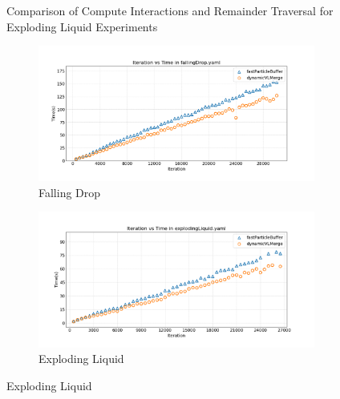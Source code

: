\begin{figure}[htbp]
    \vspace{1em}
    \caption{Comparison of Compute Interactions and Remainder Traversal for Exploding Liquid Experiments}
    \label{fig:mainexplodingLiquid_inter}
\end{figure}


\begin{figure}[htbp]
    \centering
    \vspace{-0.7em}
    \begin{subfigure}[b]{\textwidth}
        \centering
        \includegraphics[width=0.85\linewidth]{graphs/fallingDrop/freqvstimeiter.png}
        \vspace{-0.5em}
        \caption{\scriptsize Falling Drop}
        \label{fig:tuningfallingDropIter}
    \end{subfigure}

    \begin{subfigure}[b]{\textwidth}
        \centering
        \includegraphics[width=0.85\linewidth]{graphs/explodingLiquid/freqvstimeiter.png}
        \vspace{-0.5em}
        \caption{\scriptsize Exploding Liquid}
        \label{fig:tuningexplodingLiquidIter}
    \end{subfigure}


\end{figure}
